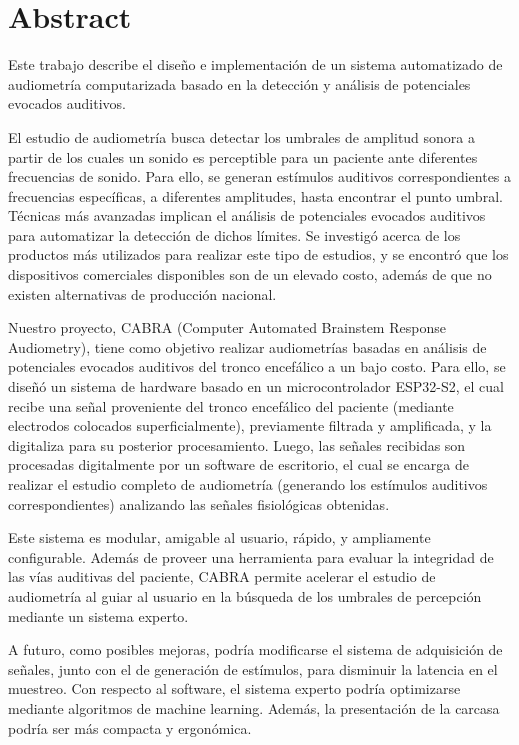 \section{Abstract} \label{abstract}

Este trabajo describe el diseño e implementación de un sistema automatizado de audiometría computarizada basado en
la detección y análisis de potenciales evocados auditivos.

El estudio de audiometría busca detectar los umbrales de amplitud sonora a partir de los cuales un sonido es
perceptible para un paciente ante diferentes frecuencias de sonido.
Para ello, se generan estímulos auditivos correspondientes a frecuencias específicas, a diferentes amplitudes, hasta
encontrar el punto umbral.
Técnicas más avanzadas implican el análisis de potenciales evocados auditivos para automatizar la detección de
dichos límites.
Se investigó acerca de los productos más utilizados para realizar este tipo de estudios, y se encontró que los
dispositivos comerciales disponibles son de un elevado costo, además de que no existen alternativas de producción
nacional.

Nuestro proyecto, CABRA (Computer Automated Brainstem Response Audiometry), tiene como objetivo realizar audiometrías
basadas en análisis de potenciales evocados auditivos del tronco encefálico a un bajo costo.
Para ello, se diseñó un sistema de hardware basado en un microcontrolador ESP32-S2, el cual recibe una señal
proveniente del tronco encefálico del paciente (mediante electrodos colocados superficialmente), previamente
filtrada y amplificada, y la digitaliza para su posterior procesamiento.
Luego, las señales recibidas son procesadas digitalmente por un software de escritorio, el cual se encarga de
realizar el estudio completo de audiometría (generando los estímulos auditivos correspondientes) analizando las
señales fisiológicas obtenidas.

Este sistema es modular, amigable al usuario, rápido, y ampliamente configurable.
Además de proveer una herramienta para evaluar la integridad de las vías auditivas del paciente, CABRA permite
acelerar el estudio de audiometría al guiar al usuario en la búsqueda de los umbrales de percepción mediante un
sistema experto.

A futuro, como posibles mejoras, podría modificarse el sistema de adquisición de señales, junto con el de generación
de estímulos, para disminuir la latencia en el muestreo.
Con respecto al software, el sistema experto podría optimizarse mediante algoritmos de machine learning.
Además, la presentación de la carcasa podría ser más compacta y ergonómica.


